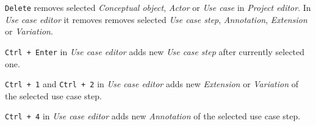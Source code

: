 \verb|Delete| removes selected \emph{Conceptual object}, \emph{Actor} or \emph{Use case} in \emph{Project editor}.
In \emph{Use case editor} it removes removes selected \emph{Use case step}, \emph{Annotation}, \emph{Extension} or \emph{Variation}.  

\verb|Ctrl + Enter| in \emph{Use case editor} adds new \emph{Use case step} after currently selected one.

\verb|Ctrl + 1| and \verb|Ctrl + 2| in \emph{Use case editor} adds new \emph{Extension} or \emph{Variation} of the selected use case step.

\verb|Ctrl + 4| in \emph{Use case editor} adds new \emph{Annotation} of the selected use case step.

